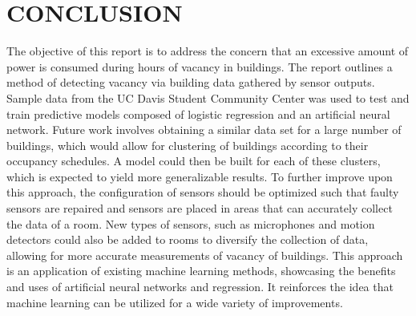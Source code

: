 \documentclass[letterpaper, 12 pt, conference]{ieeeconf}  %
\begin{document}
\section{CONCLUSION}

The objective of this report is to address the concern that an excessive amount of power is consumed during hours of vacancy in buildings. The report outlines a method of detecting vacancy via building data gathered by sensor outputs. Sample data from the UC Davis Student Community Center was used to test and train predictive models composed of logistic regression and an artificial neural network. Future work involves obtaining a similar data set for a large number of buildings, which would allow for clustering of buildings according to their occupancy schedules. A model could then be built for each of these clusters, which is expected to yield more generalizable results. To further improve upon this approach, the configuration of sensors should be optimized such that faulty sensors are repaired and sensors are placed in areas that can accurately collect the data of a room. New types of sensors, such as microphones and motion detectors could also be added to rooms to diversify the collection of data, allowing for more accurate measurements of vacancy of buildings. This approach is an application of existing machine learning methods, showcasing the benefits and uses of artificial neural networks and regression.  It reinforces the idea that machine learning can be utilized for a wide variety of improvements.

\addtolength{\textheight}{-12cm}   %







\end{document}

